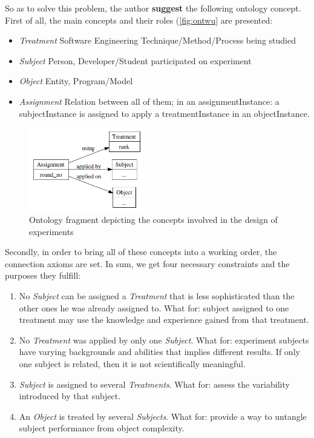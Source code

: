 	So as to solve this problem, the author \textbf{suggest} the following ontology concept. First of all, the main concepts and their roles (\autoref{fig:ontwu} are presented: 
	\begin{itemize}
		\item{\textit{Treatment}} Software Engineering Technique/Method/Process being studied
		\item{\textit{Subject}} Person, Developer/Student participated on experiment
		\item{\textit{Object}} Entity, Program/Model
		\item{\textit{Assignment}} Relation between all of them; in an assignmentInstance: a subjectInstance is assigned to apply a treatmentInstance in an objectInstance. 
	\end{itemize}
	\begin{figure}
		\centering
		\includegraphics[width=5cm]{images/OntWu.PNG}
		\caption{Ontology fragment depicting the concepts involved in the design of experiments\cite{SiyWu12}}
		\label{fig:ontwu}
	\end{figure} 
	Secondly, in order to bring all of these concepts into a working order, the connection axioms are set. In sum, we get four necessary constraints and the purposes they fulfill:
	\begin{enumerate}
		\item No \textit{Subject} can be assigned a \textit{Treatment} that is less sophisticated than the other ones he was already assigned to. What for: subject assigned to one treatment may use the knowledge and experience
		gained from that treatment.
		\item No \textit{Treatment} was applied by only one \textit{Subject}. What for: experiment subjects have varying backgrounds and abilities that implies different results. If only one subject is related, then it is not scientifically meaningful.
		\item \textit{Subject} is assigned to several \textit{Treatments}. What for: assess the variability introduced by that subject.
		\item An \textit{Object} is treated by several \textit{Subjects}. What for: provide a way to untangle subject performance from object complexity.
	\end{enumerate}
	

